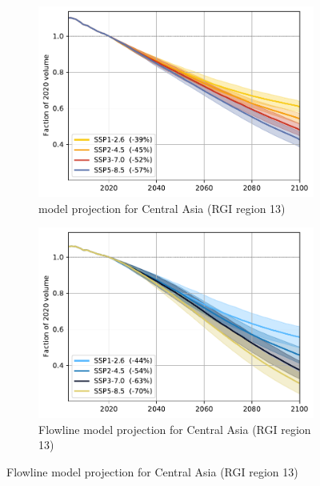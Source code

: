       \begin{figure}[htp]

          \begin{subfigure}[b]{0.476\textwidth}
              \caption{\Vas{} model projection for Central Asia (RGI region 13) }
              \label{fig:cmip:vas_reg_13}
              \centering
              \includegraphics[width=\textwidth]{../plots/final_plots/time_series/cmip/cmip_vas_13.pdf}
          \end{subfigure}
          \hfill
          \begin{subfigure}[b]{0.476\textwidth}
              \caption{Flowline model projection for Central Asia (RGI region 13) }
              \label{fig:cmip:fl_reg_13}
              \centering
              \includegraphics[width=\textwidth]{../plots/final_plots/time_series/cmip/cmip_fl_13.pdf}
          \end{subfigure}


\end{figure}
